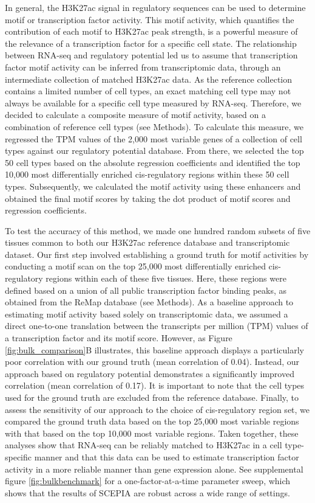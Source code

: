 In general, the H3K27ac signal in regulatory sequences can be used to determine motif or transcription factor activity\cite{FANTOM2009,Balwierz2014,Madsen_2017}. This motif activity, which quantifies the contribution of each motif to H3K27ac peak strength, is a powerful measure of the relevance of a transcription factor for a specific cell state. The relationship between RNA-seq and regulatory potential led us to assume that transcription factor motif activity can be inferred from transcriptomic data, through an intermediate collection of matched H3K27ac data. As the reference collection contains a limited number of cell types, an exact matching cell type may not always be available for a specific cell type measured by RNA-seq. Therefore, we decided to calculate a composite measure of motif activity, based on a combination of reference cell types (see Methods). To calculate this measure, we regressed the TPM values of the 2,000 most variable genes of a collection of cell types against our regulatory potential database. From there, we selected the top 50 cell types based on the absolute regression coefficients and identified the top 10,000 most differentially enriched cis-regulatory regions within these 50 cell types. Subsequently, we calculated the motif activity using these enhancers and obtained the final motif scores by taking the dot product of motif scores and regression coefficients. 

To test the accuracy of this method, we made one hundred random subsets of five tissues common to both our H3K27ac reference database and transcriptomic dataset. Our first step involved establishing a ground truth for motif activities by conducting a motif scan on the top 25,000 most differentially enriched cis-regulatory regions within each of these five tissues. Here, these regions were defined based on a union of all public transcription factor binding peaks, as obtained from the ReMap database\cite{Chneby2017} (see Methods). As a baseline approach to estimating motif activity based solely on transcriptomic data, we assumed a direct one-to-one translation between the transcripts per million (TPM) values of a transcription factor and its motif score. However, as Figure \ref{fig:bulk_comparison}B illustrates, this baseline approach displays a particularly poor correlation with our ground truth (mean correlation of 0.04). Instead, our approach based on regulatory potential demonstrates a significantly improved correlation (mean correlation of 0.17). It is important to note that the cell types used for the ground truth are excluded from the reference database. Finally, to assess the sensitivity of our approach to the choice of cis-regulatory region set, we compared the ground truth data based on the top 25,000 most variable regions with that based on the top 10,000 most variable regions. Taken together, these analyses show that RNA-seq can be reliably matched to H3K27ac in a cell type-specific manner and that this data can be used to estimate transcription factor activity in a more reliable manner than gene expression alone. See supplemental figure \ref{fig:bulkbenchmark} for a one-factor-at-a-time parameter sweep, which shows that the results of SCEPIA are robust across a wide range of settings.

